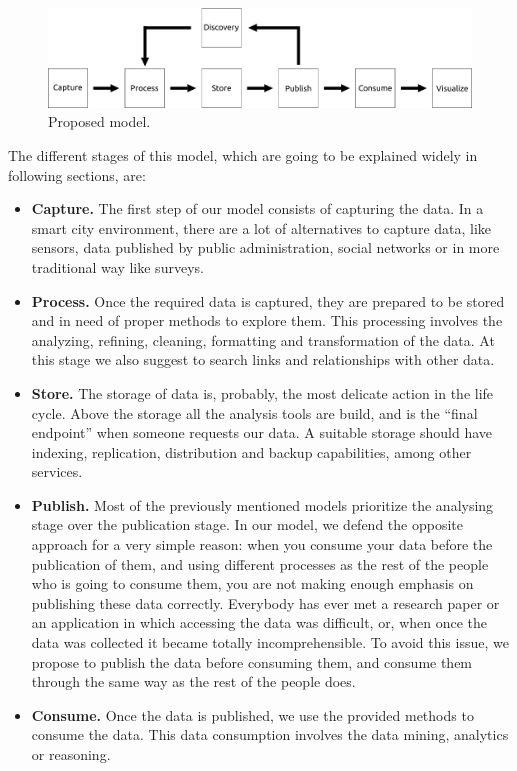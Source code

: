 \begin{figure}
    \center
    \includegraphics[width=0.88\linewidth]{img/data_lifecycle/model.pdf}
    \caption{Proposed model.}
    \label{fig:model}
\end{figure}

The different stages of this model, which are going to be explained widely in following sections, are:
\begin{itemize}
    \item \textbf{Capture.} The first step of our model consists of capturing the data. In a smart city environment, there are a lot of alternatives to capture data, like sensors, data published by public administration, social networks or in more traditional way like surveys.
    \item \textbf{Process.} Once the required data is captured, they are prepared to be stored and in need of proper methods to explore them. This processing involves the analyzing, refining, cleaning, formatting and transformation of the data. At this stage we also suggest to search links and relationships with other data.
    \item \textbf{Store.} The storage of data is, probably, the most delicate action in the life cycle. Above the storage  all the analysis tools are build, and is the ``final endpoint'' when someone requests our data. A suitable storage should have indexing, replication, distribution and backup capabilities, among other services.
    \item \textbf{Publish.} Most of the previously mentioned models prioritize the analysing stage over the publication stage. In our model, we defend the opposite approach for a very simple reason: when you consume your data before the publication of them, and using different processes as the rest of the people who is going to consume them, you are not making enough emphasis on publishing these data correctly. Everybody has ever met a research paper or an application in which accessing the data was difficult, or, when once the data was collected it became totally incomprehensible. To avoid this issue, we propose to publish the data before consuming them, and consume them through the same way as the rest of the people does.
    \item \textbf{Consume.} Once the data is published, we use the provided methods to consume the data. This data consumption involves the data mining, analytics or reasoning.

\end{itemize}
